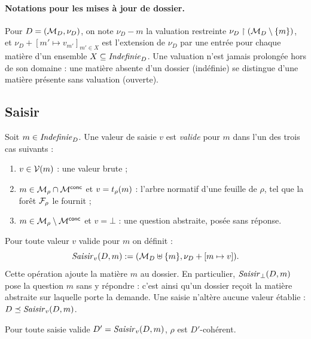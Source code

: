 \documentclass[review]{jflart}
\begin{document}
\paragraph{Notations pour les mises à jour de dossier.} Pour \(D=(\mathcal{M}_D,\nu_D)\), on note \(\nu_D-m\) la valuation restreinte
\(\nu_D\mathrel\upharpoonright(\mathcal{M}_D\setminus\{m\})\), et \(\nu_D+[m'\mapsto v_{m'}]_{m'\in X}\) est l'extension de
\(\nu_D\) par une entrée pour chaque matière d'un ensemble
\(X\subseteq\mathit{Indefinie}_D\). Une valuation n'est jamais
prolongée hors de son domaine : une matière absente d'un dossier (indéfinie)
se distingue d'une matière présente sans valuation (ouverte). 

\subsection{Saisir}\label{sec:saisir}
Soit $m\in\mathit{Indefinie}_D$. Une valeur de saisie $v$ est \emph{valide} pour $m$ dans
l'un des trois cas suivants :
\begin{enumerate}
\item $v\in\mathcal{V}(m)$ : une valeur brute ;
\item $m\in\mathcal{M}_\rho\cap\mathcal{M}^{\mathsf{conc}}$ et $v=t_\rho(m)$ : l'arbre normatif d'une
  feuille de $\rho$, tel que la forêt $\mathcal{F}_\rho$ le fournit ;
\item $m\in \mathcal{M}_\rho\setminus\mathcal{M}^{\mathsf{conc}}$ et $v=\bot$ : une question abstraite,
  posée sans réponse.
\end{enumerate}
Pour toute valeur $v$ valide pour $m$ on définit :
\begin{equation}
\mathit{Saisir}_v(D,m):=(\mathcal{M}_D\uplus\{m\},\nu_D+[m\mapsto v]).
\label{eq:input}
\end{equation}
Cette opération ajoute la matière \(m\) au dossier. En particulier, \(\mathit{Saisir}_\bot(D,m)\) pose la
question \(m\) sans y répondre : c'est ainsi qu'un dossier reçoit la matière abstraite sur laquelle porte la demande. Une saisie n'altère aucune valeur établie : \(D\mathrel{\preceq}\mathit{Saisir}_v(D,m)\).

\begin{prop}\label{prop:coh-input}
Pour toute saisie valide $D'=\mathit{Saisir}_v(D,m)$, $\rho$ est $D'$-cohérent.
\end{prop}
\end{document}
